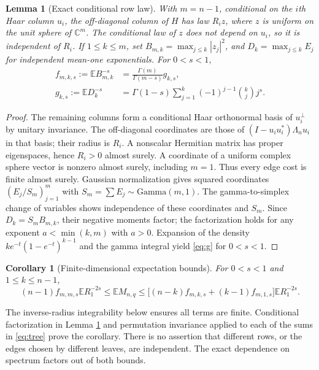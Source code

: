 \documentclass[11pt]{article}
\newtheorem{lemma}[theorem]{Lemma}
\newtheorem{corollary}[theorem]{Corollary}
\newcommand{\E}{\mathbb E}
\newcommand{\C}{\mathbb C}
\begin{document}
\begin{lemma}[Exact conditional row law]\label{lem:row}
With $m=n-1$, conditional on the $i$th Haar column $u_i$, the off-diagonal column of $H$ has law $R_i z$, where $z$ is uniform on the unit sphere of $\C^m$. The conditional law of $z$ does not depend on $u_i$, so it is independent of $R_i$. If $1\le k\le m$, set $B_{m,k}=\max_{j\le k}|z_j|^2$, and $D_k=\max_{j\le k} E_j$ for independent mean-one exponentials. For $0<s<1$,
\begin{align}
f_{m,k,s}:=\E B_{m,k}^{-s}&=\frac{\Gamma(m)}{\Gamma(m-s)}g_{k,s},\\
g_{k,s}:=\E D_k^{-s}&=\Gamma(1-s)\sum_{j=1}^k(-1)^{j-1}\binom{k}{j} j^s.\label{eq:g}
\end{align}
\end{lemma}
\begin{proof}
The remaining columns form a conditional Haar orthonormal basis of $u_i^\perp$ by unitary invariance. The off-diagonal coordinates are those of $(I-u_iu_i^*)\Lambda_n u_i$ in that basis; their radius is $R_i$. A nonscalar Hermitian matrix has proper eigenspaces, hence $R_i>0$ almost surely. A coordinate of a uniform complex sphere vector is nonzero almost surely, including $m=1$. Thus every edge cost is finite almost surely. Gaussian normalization gives squared coordinates $(E_j/S_m)_{j=1}^m$ with $S_m=\sum E_j\sim\mathrm{Gamma}(m,1)$. The gamma-to-simplex change of variables shows independence of these coordinates and $S_m$. Since $D_k=S_mB_{m,k}$, their negative moments factor; the factorization holds for any exponent $a<\min(k,m)$ with $a>0$. Expansion of the density $ke^{-t}(1-e^{-t})^{k-1}$ and the gamma integral yield \eqref{eq:g} for $0<s<1$.
\end{proof}

\begin{corollary}[Finite-dimensional expectation bounds]\label{cor:sandwich}
For $0<s<1$ and $1\le k\le n-1$,
\begin{equation}
(n-1)f_{m,m,s}\E R_1^{-2s}\le\E M_{n,q}\le
\bigl[(n-k)f_{m,k,s}+(k-1)f_{m,1,s}\bigr]\E R_1^{-2s}.
\label{eq:finite}
\end{equation}
\end{corollary}
The inverse-radius integrability below ensures all terms are finite. Conditional factorization in Lemma \ref{lem:row} and permutation invariance applied to each of the sums in \eqref{eq:tree} prove the corollary. There is no assertion that different rows, or the edges chosen by different leaves, are independent. The exact dependence on spectrum factors out of both bounds.
\end{document}
